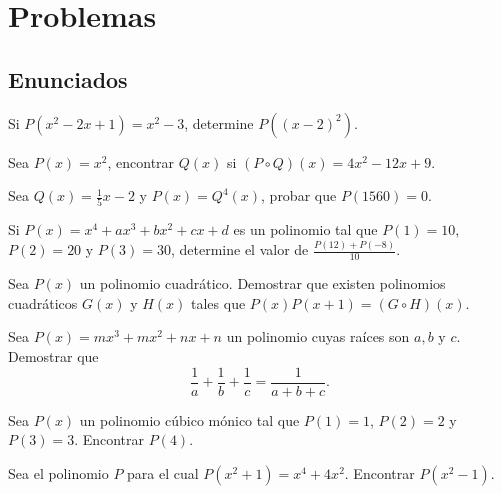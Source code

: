 \newpage
\section{Problemas}

\subsection{Enunciados}

\begin{section-problem}
    Si $P(x^2 - 2x + 1) = x^2 - 3$, determine $P((x - 2)^2).$
\end{section-problem}

\begin{section-problem}
    Sea $P(x) = x^2$, encontrar $Q(x)$ si $(P \circ Q)(x) = 4x^2 - 12x + 9$.
\end{section-problem}

\begin{section-problem}
    Sea $Q(x) = \frac{1}{5} x - 2$ y $P(x) = Q^4(x)$, probar que $P(1560) = 0$.
\end{section-problem}


\begin{section-problem}
    Si $P(x) = x^4 + ax^3 + bx^2 + cx + d$ es un polinomio tal que $P(1) = 10$, $P(2) = 20$ y $P(3) = 30$, determine el valor de $\frac{P(12) + P(-8)}{10}.$
\end{section-problem}

\begin{section-problem}
    Sea $P(x)$ un polinomio cuadrático.
    Demostrar que existen polinomios cuadráticos $G(x)$ y $H(x)$ tales que $P(x)P(x+1) = (G \circ H)(x).$
\end{section-problem}

\begin{section-problem}
    Sea $P(x) = mx^3 + mx^2 + nx + n$ un polinomio cuyas raíces son $a, b \mbox{ y } c$.
    Demostrar que \[\frac{1}{a} + \frac{1}{b} + \frac{1}{c} = \frac{1}{a + b + c}.\]
\end{section-problem}

\begin{section-problem}
    Sea $P(x)$ un polinomio cúbico mónico tal que $P(1) = 1$, $P(2) = 2$ y $P(3) = 3$.
    Encontrar $P(4).$
\end{section-problem}


\begin{section-problem}
    Sea el polinomio $P$ para el cual $P(x^2 + 1) = x^4 + 4x^2$.
    Encontrar $P(x^2 - 1).$
\end{section-problem}

